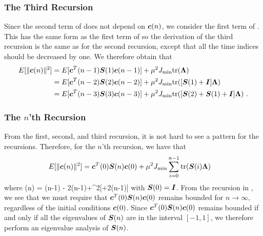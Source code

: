 \subsubsection{The Third Recursion}
Since the second term of  does not depend on $\boldsymbol{c}(n)$, we consider the first term of . This has the same form as the first term of  so the derivation of the third recursion is the same as for the second recursion, except that all the time indices should be decreased by one. We therefore obtain that
\begin{align}
    E[\|\vect{c}(n)\|^2] &= E[\vect{c}^T(n-1)\vect{S}(1)\vect{c}(n-1)] +\mu^2J_\textup{min}\tr{\vect{\Lambda}}\\
    &= E[\vect{c}^T(n-2)\vect{S}(2)\vect{c}(n-2)]+\mu^2J_\textup{min}\tr{[\vect{S}(1)+\vect{I}]\vect{\Lambda}}\\
    &= E[\vect{c}^T(n-3)\vect{S}(3)\vect{c}(n-3)]+\mu^2J_\textup{min}\tr{[\vect{S}(2)+\vect{S}(1)+\vect{I}]\vect{\Lambda}}\ .
    \label{eq:app_lms_third_recur}
\end{align}

\subsubsection{The $n$'th Recursion}
From the first, second, and third recursion, it is not hard to see a pattern for the recursions. Therefore, for the $n$'th recursion, we have that
\begin{align}
    E[\|\boldsymbol{c}(n)\|^2] &= \boldsymbol{c}^T(0)\boldsymbol{S}(n)\boldsymbol{c}(0)+\mu^2J_\textup{min}\sum_{i=0}^{n-1}\textup{tr}(\boldsymbol{S}(i)\boldsymbol{\Lambda})
    \label{eq:app_lms_nth_recur}
\end{align}
where
\bmath
  (n) = (n-1) - 2\mu\vect{\Lambda}(n-1)+\mu^2[\vect{\Lambda}+2\vect{\Lambda}(n-1)\vect{\Lambda}]
  \label{eq:app_lms_Sn_recur}
\emath
with $\boldsymbol{S}(0) = \boldsymbol{I}$. From the recursion in , we see that we must require that $\boldsymbol{c}^T(0)\boldsymbol{S}(n)\boldsymbol{c}(0)$ remains bounded for $n\to\infty$, regardless of the initial conditions $\boldsymbol{c}(0)$. Since $\boldsymbol{c}^T(0)\boldsymbol{S}(n)\boldsymbol{c}(0)$ remains bounded if and only if all the eigenvalues of $\boldsymbol{S}(n)$ are in the interval $[-1,1]$, we therefore perform an eigenvalue analysis of $\boldsymbol{S}(n)$.

